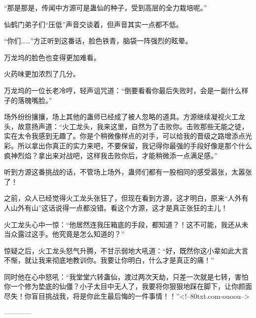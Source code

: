 \begin{this_body}
“那是那是，传闻中方源可是蛊仙的种子，受到高层的全力栽培呢。”

仙鹤门弟子们“压低”声音交谈着，但声音其实一点都不低。

“你们……”方正听到这番话，脸色铁青，脑袋一阵强烈的眩晕。

万龙坞的脸色也变得更加难看。

火药味更加浓烈了几分。

万龙坞的一位长老冷哼，轻声诅咒道：“倒要看看你最后失败时，会是一副什么样子的落魄嘴脸。”

场外纷纷攘攘，场上其他的蛊师已经成了被人忽略的道具。方源继续凝视火工龙头，故意扬声道：“火工龙头，我来这里，自然为了击败你。击败那些无能之徒，实在太令我感到无趣了。你是个稍微像样点的对手，可以给我的晋级之路增添点光彩。所以拿出你真正的实力来吧，不要保留，我记得你最强的手段好像是那个什么疯神烈焰？拿出来对战吧，这样我击败你后，才能稍微添一点满足感。”

听到方源这番挑战的话，不管场上场外，蛊师们都有一股相同的感受嚣张，太嚣张了！

之前，众人已经觉得火工龙头张狂了，但现在看到方源，这才明白，原来“人外有人山外有山”这话说得一点都没错。看这个方源，这才是真正张狂的主儿！

火工龙头心中一惊：“他居然连我压箱底的手段，都知道？！这不可能，我还从未当众露过这手。他究竟是怎么知道的？”

惊疑之后，火工龙头怒气升腾，不甘示弱地大吼道：“好，既然你这小辈如此大言不惭，就让我来彻底地教训你。我要让你明白，什么才是真正的痛！”

同时他在心中怒吼：“我堂堂六转蛊仙，渡过两次天劫，只差一次就是七转，害怕你一个修为垫底的仙僵？小子太目中无人了，我要将你狠狠地踩在脚下，让你颜面尽失！你盲目挑战我，将是你此生最后悔的一件事情！！”<!--80txt.com-ouoou-->

------------

\end{this_body}

